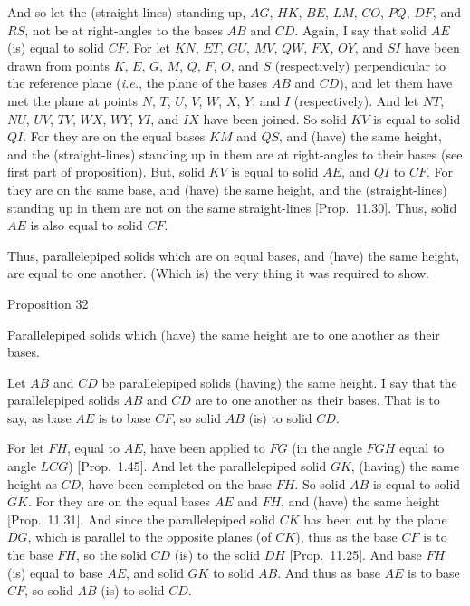 \epsfysize=1.8in
\centerline{}

And so let the (straight-lines) standing up, $AG$, $HK$, $BE$,
$LM$, $CO$, $PQ$, $DF$, and $RS$, not be at right-angles to
the bases $AB$ and $CD$. Again, I say that solid $AE$ (is) equal to
solid  $CF$. For let $KN$, $ET$, $GU$, $MV$, $QW$, $FX$, $OY$, and
$SI$ have been drawn from points $K$, $E$, $G$, $M$, $Q$, $F$, $O$, and
$S$ (respectively) perpendicular to the reference plane ({\em i.e.}, the plane of the bases $AB$ and $CD$), and let them have met
the plane at points $N$, $T$, $U$, $V$, $W$, $X$, $Y$, and $I$ (respectively). And let $NT$, $NU$, $UV$, $TV$, $WX$, $WY$, $YI$, and
$IX$ have been joined. So solid $KV$ is equal to solid $QI$. For they are on
the equal bases $KM$ and $QS$, and (have) the same height, and the (straight-lines) standing up in them are at right-angles to their bases (see first part of proposition).  But, solid $KV$ is equal to
solid $AE$, and $QI$ to $CF$.
For they are on the same base, and (have)
the same height, and the (straight-lines) standing up in them are not on
the same straight-lines [Prop.~11.30]. Thus,
solid $AE$ is also equal to solid $CF$.

Thus, parallelepiped solids which are on equal bases,
and (have) the same height, are equal to one another. (Which is) the very thing
it was required to show.


\begin{center}
{\large Proposition 32}
\end{center}

Parallelepiped solids which (have) the same height
are to one another as their bases.

\centerline{}

Let $AB$ and $CD$ be parallelepiped solids (having) the same height.
I say that the parallelepiped solids $AB$ and $CD$
are to one another as their bases. That is to say, as base $AE$ is to base
$CF$, so solid $AB$ (is) to solid $CD$.

For let $FH$, equal to $AE$, have been applied to $FG$ (in the angle
$FGH$ equal to angle $LCG$) [Prop.~1.45]. And let the parallelepiped solid $GK$, (having) the same height as $CD$, have
been completed on the base $FH$. So solid $AB$ is equal to solid
$GK$. For they are on the equal bases $AE$ and $FH$, and
(have) the same height [Prop.~11.31]. 
And since the parallelepiped solid $CK$ has been cut by the plane
$DG$, which is parallel to the opposite planes (of $CK$), thus as
the base $CF$ is to the base $FH$, so the solid $CD$ (is) to the
solid $DH$ [Prop.~11.25]. And  base
$FH$ (is) equal to base $AE$, and solid $GK$ to solid $AB$. And thus
as base $AE$ is to base $CF$, so solid $AB$ (is) to solid $CD$.

